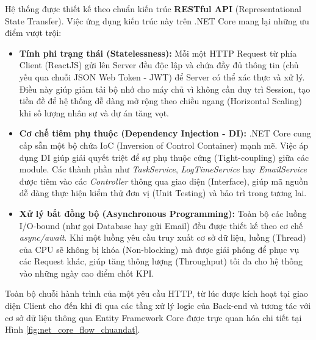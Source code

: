\documentclass[a4paper,13.5pt]{extreport}
\begin{document}
Hệ thống được thiết kế theo chuẩn kiến trúc \textbf{RESTful API} (Representational State Transfer). Việc ứng dụng kiến trúc này trên .NET Core mang lại những ưu điểm vượt trội:
\begin{itemize}
    \item \textbf{Tính phi trạng thái (Statelessness):} Mỗi một HTTP Request từ phía Client (ReactJS) gửi lên Server đều độc lập và chứa đầy đủ thông tin (chủ yếu qua chuỗi JSON Web Token - JWT) để Server có thể xác thực và xử lý. Điều này giúp giảm tải bộ nhớ cho máy chủ vì không cần duy trì Session, tạo tiền đề để hệ thống dễ dàng mở rộng theo chiều ngang (Horizontal Scaling) khi số lượng nhân sự và dự án tăng vọt.
    \item \textbf{Cơ chế tiêm phụ thuộc (Dependency Injection - DI):} .NET Core cung cấp sẵn một bộ chứa IoC (Inversion of Control Container) mạnh mẽ. Việc áp dụng DI giúp giải quyết triệt để sự phụ thuộc cứng (Tight-coupling) giữa các module. Các thành phần như \textit{TaskService}, \textit{LogTimeService} hay \textit{EmailService} được tiêm vào các \textit{Controller} thông qua giao diện (Interface), giúp mã nguồn dễ dàng thực hiện kiểm thử đơn vị (Unit Testing) và bảo trì trong tương lai.
    \item \textbf{Xử lý bất đồng bộ (Asynchronous Programming):} Toàn bộ các luồng I/O-bound (như gọi Database hay gửi Email) đều được thiết kế theo cơ chế \textit{async/await}. Khi một luồng yêu cầu truy xuất cơ sở dữ liệu, luồng (Thread) của CPU sẽ không bị khóa (Non-blocking) mà được giải phóng để phục vụ các Request khác, giúp tăng thông lượng (Throughput) tối đa cho hệ thống vào những ngày cao điểm chốt KPI.
\end{itemize}

Toàn bộ chuỗi hành trình của một yêu cầu HTTP, từ lúc được kích hoạt tại giao diện Client cho đến khi đi qua các tầng xử lý logic của Back-end và tương tác với cơ sở dữ liệu thông qua Entity Framework Core được trực quan hóa chi tiết tại Hình \ref{fig:net_core_flow_chuandat}.
\end{document}
